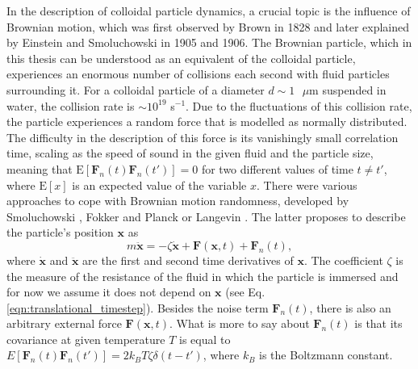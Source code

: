 \documentclass{master_thesis}
\begin{document}
In the description of colloidal particle dynamics, a crucial topic is the influence of Brownian motion, which was first observed by Brown in 1828 \cite{brown_1828} and later explained by Einstein \cite{einstein1905,einstein1906} and Smoluchowski \cite{smoluchowski1906} in 1905 and 1906. The Brownian particle, which in this thesis can be understood as an equivalent of the colloidal particle, experiences an enormous number of collisions each second with fluid particles surrounding it. For a colloidal particle of a diameter $d \sim1 \textrm{ }\mu\textrm{m}$ suspended in water, the collision rate is $\sim 10^{19}$ s$^{-1}$. Due to the fluctuations of this collision rate, the particle experiences a random force that is modelled as normally distributed. The difficulty in the description of this force is its vanishingly small correlation time, scaling as the speed of sound in the given fluid and the particle size, meaning that $\textrm{E}[\boldsymbol{F}_n(t)\boldsymbol{F}_n(t')]=0$ for two different values of time $t \neq t'$, where $\textrm{E}[x]$ is an expected value of the variable $x$. There were various approaches to cope with Brownian motion randomness, developed by Smoluchowski \cite{smoluchowski1906}, Fokker \cite{fokker1914} and Planck \cite{planck1917} or Langevin \cite{langevin1908}. The latter proposes to describe the particle's position $\boldsymbol{x}$ as
\begin{equation}
    m \ddot{\boldsymbol{x}} = -\zeta \dot{\boldsymbol{x}} + \boldsymbol{F}(\boldsymbol{x},t) + \boldsymbol{F}_n(t),
\label{eqn:langevin}
\end{equation}
where $\dot{\boldsymbol{x}}$ and $\ddot{\boldsymbol{x}}$ are the first and second time derivatives of $\boldsymbol{x}$. The coefficient $\zeta$ is the measure of the resistance of the fluid in which the particle is immersed and for now we assume it does not depend on $\boldsymbol{x}$ (see Eq. \eqref{eqn:translational_timestep}). Besides the noise term $\boldsymbol{F}_n(t)$, there is also an arbitrary external force $\boldsymbol{F}(\boldsymbol{x},t)$. What is more to say about $\boldsymbol{F}_n(t)$ is that its covariance at given temperature $T$ is equal to $E [ \boldsymbol{F}_n(t)\boldsymbol{F}_n(t') ] =  2 k_B T \zeta \delta(t-t') $, where $k_B$ is the Boltzmann constant.
\end{document}
